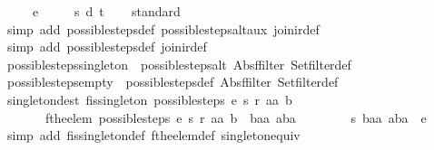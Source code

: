 \begin{isabellebody}
\ \ \ \ \ e\ {\isacharequal}\isanewline
\ \ \ \ {\isacharbraceleft}{\isacharbar}{\isacharparenleft}{\isacharparenleft}s{\isacharcomma}\ d{\isacharparenright}{\isacharcomma}\ t{\isacharparenright}{\isacharbar}{\isacharbraceright}{\isacharparenright}{\isachardoublequoteclose}\isanewline
%
\isadelimproof
\ \ %
\endisadelimproof
%
\isatagproof
{}\isamarkupfalse%
\ standard\isanewline
\ \ \ \isamarkupfalse%
\ {\isacharparenleft}simp\ add{\isacharcolon}\ possible{\isacharunderscore}steps{\isacharunderscore}def\ possible{\isacharunderscore}steps{\isacharunderscore}alt{\isacharunderscore}aux\ join{\isacharunderscore}ir{\isacharunderscore}def{\isacharparenright}\isanewline
\ \ \isamarkupfalse%
\ {\isacharparenleft}simp\ add{\isacharcolon}\ possible{\isacharunderscore}steps{\isacharunderscore}def\ join{\isacharunderscore}ir{\isacharunderscore}def{\isacharparenright}%
\endisatagproof
{\isafoldproof}%
%
\isadelimproof
\isanewline
%
\endisadelimproof
\isanewline
{}\isamarkupfalse%
\ possible{\isacharunderscore}steps{\isacharunderscore}singleton\ {\isacharequal}\ possible{\isacharunderscore}steps{\isacharunderscore}alt\ Abs{\isacharunderscore}ffilter\ Set{\isachardot}filter{\isacharunderscore}def\isanewline
{}\isamarkupfalse%
\ possible{\isacharunderscore}steps{\isacharunderscore}empty\ {\isacharequal}\ possible{\isacharunderscore}steps{\isacharunderscore}def\ Abs{\isacharunderscore}ffilter\ Set{\isachardot}filter{\isacharunderscore}def\isanewline
\isanewline
{}\isamarkupfalse%
\ singleton{\isacharunderscore}dest{\isacharcolon}\ {\isachardoublequoteopen}fis{\isacharunderscore}singleton\ {\isacharparenleft}possible{\isacharunderscore}steps\ e\ s\ r\ aa\ b{\isacharparenright}\ {\isasymLongrightarrow}\isanewline
\ \ \ \ \ \ \ fthe{\isacharunderscore}elem\ {\isacharparenleft}possible{\isacharunderscore}steps\ e\ s\ r\ aa\ b{\isacharparenright}\ {\isacharequal}\ {\isacharparenleft}baa{\isacharcomma}\ aba{\isacharparenright}\ {\isasymLongrightarrow}\isanewline
\ \ \ \ \ \ \ {\isacharparenleft}{\isacharparenleft}s{\isacharcomma}\ baa{\isacharparenright}{\isacharcomma}\ aba{\isacharparenright}\ {\isacharbar}{\isasymin}{\isacharbar}\ e{\isachardoublequoteclose}\isanewline
%
\isadelimproof
\ \ %
\endisadelimproof
%
\isatagproof
{}\isamarkupfalse%
\ {\isacharparenleft}simp\ add{\isacharcolon}\ fis{\isacharunderscore}singleton{\isacharunderscore}def\ fthe{\isacharunderscore}elem{\isacharunderscore}def\ singleton{\isacharunderscore}equiv{\isacharparenright}\isanewline

\end{isabellebody}
